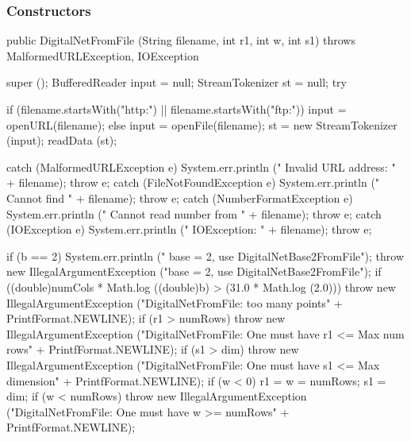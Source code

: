\begin{code}
\begin{hide}
{{{       } catch (FileNotFoundException e) {
         System.err.println (e + " *** cannot find  " + filename);
         throw e;

      } catch (IOException e) {
         // This will never catch FileNotFoundException since there
         // is a catch clause above.
         System.err.println (e + " cannot read from  " + filename);
         throw e;
      }
   }

\end{hide}
\end{code}
\subsubsection* {Constructors}
\begin{code}

   public DigitalNetFromFile (String filename, int r1, int w, int s1)
          throws MalformedURLException, IOException \begin{hide}
   {
      super ();
      BufferedReader input = null;
      StreamTokenizer st = null;
      try {
         if (filename.startsWith("http:") || filename.startsWith("ftp:"))
            input = openURL(filename);
         else
            input = openFile(filename);
         st = new StreamTokenizer (input);
         readData (st);

      } catch (MalformedURLException e) {
         System.err.println ("   Invalid URL address:   " + filename);
         throw e;
      } catch (FileNotFoundException e) {
         System.err.println ("   Cannot find  " + filename);
         throw e;
      } catch (NumberFormatException e) {
         System.err.println ("   Cannot read number from " + filename);
         throw e;
      }  catch (IOException e) {
         System.err.println ("   IOException:   " + filename);
         throw e;
      }

      if (b == 2) {
         System.err.println ("   base = 2, use DigitalNetBase2FromFile");
         throw new IllegalArgumentException
             ("base = 2, use DigitalNetBase2FromFile");
      }
      if ((double)numCols * Math.log ((double)b) > (31.0 * Math.log (2.0)))
         throw new IllegalArgumentException
            ("DigitalNetFromFile:   too many points" + PrintfFormat.NEWLINE);
      if (r1 > numRows)
         throw new IllegalArgumentException
            ("DigitalNetFromFile:   One must have   r1 <= Max num rows" +
                PrintfFormat.NEWLINE);
      if (s1 > dim)
         throw new IllegalArgumentException
            ("DigitalNetFromFile:   One must have   s1 <= Max dimension" +
                 PrintfFormat.NEWLINE);
      if (w < 0) {
         r1 = w = numRows;
         s1 = dim;
      }
      if (w < numRows)
         throw new IllegalArgumentException
            ("DigitalNetFromFile:   One must have   w >= numRows" +
              PrintfFormat.NEWLINE);

}
\end{hide}
\end{code}
